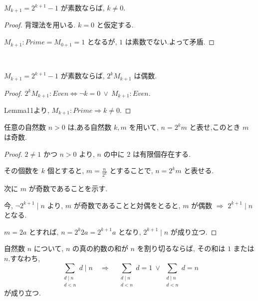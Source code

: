 \begin{lemma}\label{ne_zero_of_prime_mersenne}\leanok
{}
\(M_{k+1} = 2^{k+1} - 1\) が素数ならば, \(k \neq 0\).
\end{lemma}

\begin{proof}
背理法を用いる. \(k = 0\) と仮定する.

\(M_{k+1} : Prime = M_{0+1} = 1\) となるが, \(1\) は素数でない.よって矛盾.
\end{proof}


\begin{theorem}\label{even_two_pow_mul_mersenne_of_prime}
\leanok{}~\

\(M_{k+1} = 2^{k+1} - 1\) が素数ならば, \(2^kM_{k+1}\) は偶数.

\end{theorem}

\begin{proof}
\(2^kM_{k+1} : Even \Leftrightarrow \lnot k = 0 ~\vee ~M_{k+1} : Even\).

Lemma11より, \(M_{k+1} : Prime \Rightarrow k \neq 0\).
\end{proof}


\begin{lemma}\label{eq_two_pow_mul_odd}\leanok
任意の自然数 \(n > 0\) は,ある自然数 \(k, m\) を用いて, \(n = 2^km\) と表せ,このとき \(m\) は奇数.
\end{lemma}

\begin{proof}
\(2 \neq 1\) かつ \(n > 0\) より, \(n\) の中に \(2\) は有限個存在する.

その個数を \(k\) 個とすると, \(m = \frac{n}{2^k}\) とすることで, \(n = 2^km\) と表せる.

次に \(m\) が奇数であることを示す.

今, \(\lnot 2^{k+1} \mid n\) より, \(m\) が奇数であることと対偶をとると,
\(m\) が偶数 \(\Rightarrow\) \(2^{k+1} \mid n\) となる.

\(m = 2a\) とすれば, \(n = 2^k2a = 2^{k+1}a\) となり, \(2^{k+1} \mid n\) が成り立つ.
\end{proof}

\begin{lemma}\label{sum_properDivisors_dvd}\leanok

自然数 \(n\) について, \(n\) の真の約数の和が \(n\) を割り切るならば, その和は \(1\) または \(n\).すなわち,
\[
\sum_{\substack{d \mid n\\ d < n}} d \mid n \quad \Rightarrow \quad \sum_{\substack{d \mid n\\ d < n}} d = 1 ~\vee~ \sum_{\substack{d \mid n\\ d < n}} d = n
\]
が成り立つ.
\end{lemma}

